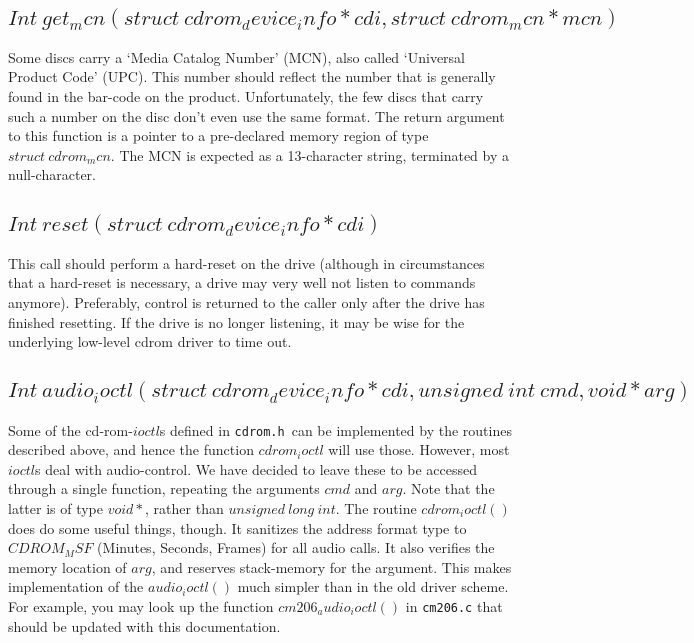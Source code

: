 \documentclass{article}
\def\cdrom{{\sc cd-rom}}
\def\cdromh{{\tt {cdrom.h}}}
\begin{document}
\subsection{$Int\ get_mcn(struct\ cdrom_device_info * cdi, struct\
  cdrom_mcn * mcn)$}

Some discs carry a `Media Catalog Number' (MCN), also called
`Universal Product Code' (UPC). This number should reflect the number
that is generally found in the bar-code on the product. Unfortunately,
the few discs that carry such a number on the disc don't even use the
same format. The return argument to this function is a pointer to a
pre-declared memory region of type $struct\ cdrom_mcn$. The MCN is
expected as a 13-character string, terminated by a null-character.

\subsection{$Int\ reset(struct\ cdrom_device_info * cdi)$}

This call should perform a hard-reset on the drive (although in
circumstances that a hard-reset is necessary, a drive may very well not
listen to commands anymore). Preferably, control is returned to the
caller only after the drive has finished resetting. If the drive is no
longer listening, it may be wise for the underlying low-level cdrom
driver to time out.

\subsection{$Int\ audio_ioctl(struct\ cdrom_device_info * cdi, unsigned\
  int\ cmd, void * arg)$}

Some of the \cdrom-$ioctl$s defined in \cdromh\ can be
implemented by the routines described above, and hence the function
$cdrom_ioctl$ will use those. However, most $ioctl$s deal with
audio-control. We have decided to leave these to be accessed through a
single function, repeating the arguments $cmd$ and $arg$. Note that
the latter is of type $void*{}$, rather than $unsigned\ long\
int$. The routine $cdrom_ioctl()$ does do some useful things,
though. It sanitizes the address format type to $CDROM_MSF$ (Minutes,
Seconds, Frames) for all audio calls. It also verifies the memory
location of $arg$, and reserves stack-memory for the argument. This
makes implementation of the $audio_ioctl()$ much simpler than in the
old driver scheme. For example, you may look up the function
$cm206_audio_ioctl()$ in {\tt {cm206.c}} that should be updated with
this documentation. 
\end{document}
